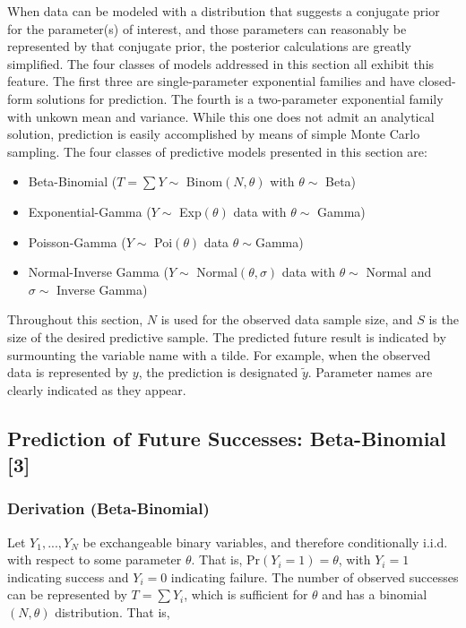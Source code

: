 \documentclass[12pt, a4paper]{article}
\begin{document}
\noindent When data can be modeled with a distribution that suggests a conjugate prior for the parameter(s) of interest, and those parameters can reasonably be represented by that conjugate prior, the posterior calculations are greatly simplified.  The four classes of models addressed in this section all exhibit this feature.  The first three are single-parameter exponential families and have closed-form solutions for prediction.  The fourth is a two-parameter exponential family with unkown mean and variance.  While this one does not admit an analytical solution, prediction is easily accomplished by means of simple Monte Carlo sampling.  The four classes of predictive models presented in this section are:
\begin{itemize}
  \item Beta-Binomial ($T = \sum Y\sim$ Binom$(N,\theta)$ with $\theta\sim$ Beta)
  \item Exponential-Gamma ($Y\sim$ Exp$(\theta)$ data with $\theta\sim$ Gamma)
  \item Poisson-Gamma ($Y\sim$ Poi$(\theta)$ data $\theta\sim$Gamma)
  \item Normal-Inverse Gamma ($Y\sim$ Normal$(\theta,\sigma)$ data with $\theta\sim$ Normal and $\sigma\sim$ Inverse Gamma)
\end{itemize}

\noindent Throughout this section, $N$ is used for the observed data sample
size, and $S$ is the size of the desired predictive sample. The predicted future result
is indicated by surmounting the variable name with a tilde.  For example, when the observed data is represented by $y$, the prediction is designated $\tilde{y}$. Parameter names are clearly indicated as they appear.

  \subsection{Prediction of Future Successes:  Beta-Binomial [3]}


    \subsubsection{Derivation (Beta-Binomial)}

    \noindent Let $Y_1,...,Y_N$ be exchangeable binary variables, and therefore conditionally i.i.d.  with respect to some parameter $\theta$. That is, Pr$(Y_i = 1) = \theta$, with $Y_i = 1$ indicating success and $Y_i = 0$ indicating failure.  The number of observed successes can be represented by $T = \sum Y_i$, which is sufficient for $\theta$ and has a binomial$(N,\theta)$ distribution.  That is,
\end{document}

